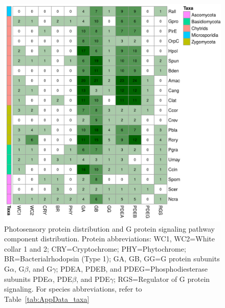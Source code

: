 
\begin{figure}[hb]
  \centering
  \includegraphics[]{./Chapter_RhodAux/img/photosenseHeatmap.png}
  \caption[Photosensory survey]{Photosensory protein distribution and G protein signaling pathway component distribution. Protein abbreviations: WC1, WC2=White collar 1 and 2; CRY=Cryptochrome; PHY=Phytochrome; BR=Bacterialrhodopsin (Type 1); GA, GB, GG=G protein subunits G$\alpha$, G$\beta$, and G$\gamma$; PDEA, PDEB, and PDEG=Phosphodiesterase subunits PDE$\alpha$, PDE$\beta$, and PDE$\gamma$; RGS=Regulator of G protein signaling. For species abbreviations, refer to Table~\ref{tab:AppData_taxa}}
  \label{fig:ChRhodA_photosenseSurvey}
\end{figure}

